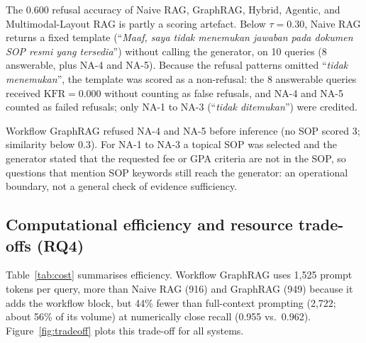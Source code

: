 \documentclass[preprint,10pt]{elsarticle}
\begin{document}
The 0.600 refusal accuracy of Naive RAG, GraphRAG, Hybrid, Agentic, and Multimodal-Layout RAG is partly a scoring artefact. Below $\tau=0.30$, Naive RAG returns a fixed template (``\textit{Maaf, saya tidak menemukan jawaban pada dokumen SOP resmi yang tersedia}'') without calling the generator, on 10 queries (8 answerable, plus NA-4 and NA-5). Because the refusal patterns omitted ``\textit{tidak menemukan}'', the template was scored as a non-refusal: the 8 answerable queries received $\text{KFR}=0.000$ without counting as false refusals, and NA-4 and NA-5 counted as failed refusals; only NA-1 to NA-3 (``\textit{tidak ditemukan}'') were credited.

Workflow GraphRAG refused NA-4 and NA-5 before inference (no SOP scored 3; similarity below 0.3). For NA-1 to NA-3 a topical SOP was selected and the generator stated that the requested fee or GPA criteria are not in the SOP, so questions that mention SOP keywords still reach the generator: an operational boundary, not a general check of evidence sufficiency.

\subsection{Computational efficiency and resource trade-offs (RQ4)}
Table~\ref{tab:cost} summarises efficiency. Workflow GraphRAG uses 1,525 prompt tokens per query, more than Naive RAG (916) and GraphRAG (949) because it adds the workflow block, but 44\% fewer than full-context prompting (2,722; about 56\% of its volume) at numerically close recall (0.955 vs.\ 0.962). Figure~\ref{fig:tradeoff} plots this trade-off for all systems.
\end{document}
